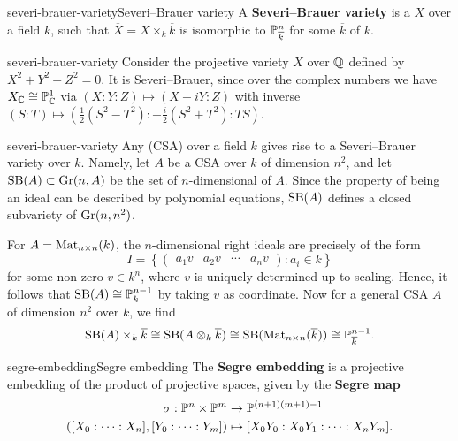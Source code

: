         

\begin{topic}{severi-brauer-variety}{Severi--Brauer variety}
    A \textbf{Severi--Brauer variety} is a  $X$ over a field $k$, such that $\overline{X} = X \times_k \overline{k}$ is isomorphic to $\mathbb{P}^n_{\overline{k}}$ for some  $\overline{k}$ of $k$.
\end{topic}

\begin{example}{severi-brauer-variety}
    Consider the projective variety $X$ over $\mathbb{Q}$ defined by $X^2 + Y^2 + Z^2 = 0$. It is Severi--Brauer, since over the complex numbers we have $X_{\mathbb{C}} \cong \mathbb{P}_{\mathbb{C}}^1$ via $(X : Y : Z) \mapsto (X + iY : Z)$ with inverse $(S : T) \mapsto (\tfrac{1}{2} (S^2 - T^2) : -\tfrac{i}{2} (S^2 + T^2) : TS)$.
\end{example}

\begin{example}{severi-brauer-variety}
    Any  (CSA) over a field $k$ gives rise to a Severi--Brauer variety over $k$. Namely, let $A$ be a CSA over $k$ of dimension $n^2$, and let $\textup{SB}(A) \subset \textup{Gr}(n, A)$ be the set of $n$-dimensional  of $A$. Since the property of being an ideal can be described by polynomial equations, $\textup{SB}(A)$ defines a closed subvariety of $\textup{Gr}(n, n^2)$.
    
    For $A = \textup{Mat}_{n \times n}(k)$, the $n$-dimensional right ideals are precisely of the form
    \[ I = \left\{ \begin{pmatrix} a_1 v & a_2 v & \cdots & a_n v \end{pmatrix} : a_i \in k \right\} \]
    for some non-zero $v \in k^n$, where $v$ is uniquely determined up to scaling. Hence, it follows that $\textup{SB}(A) \cong \mathbb{P}^{n - 1}_k$ by taking $v$ as coordinate. Now for a general CSA $A$ of dimension $n^2$ over $k$, we find
    \[ \textup{SB}(A) \times_k \overline{k} \cong \textup{SB}(A \otimes_k \overline{k}) \cong \textup{SB}(\textup{Mat}_{n \times n}(\overline{k})) \cong \mathbb{P}^{n - 1}_{\overline{k}} . \]
\end{example}

\begin{topic}{segre-embedding}{Segre embedding}
    The \textbf{Segre embedding} is a projective embedding of the product of projective spaces, given by the \textbf{Segre map}
    \[ \begin{aligned}
        \sigma : \mathbb{P}^n \times \mathbb{P}^m &\to \mathbb{P}^{(n + 1)(m + 1) - 1} \\
        ([X_0 : \cdots : X_n], [Y_0 : \cdots : Y_m]) &\mapsto [X_0 Y_0 : X_0 Y_1 : \cdots : X_n Y_m] .
    \end{aligned} \]
\end{topic}

